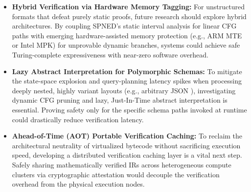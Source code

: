 \documentclass[onecolumn]{IEEEtran}
\numberwithin{equation}{section}
\theoremstyle{definition}
\theoremstyle{remark}
\begin{document}
\begin{itemize}
    \item \textbf{Hybrid Verification via Hardware Memory Tagging:} For unstructured formats that defeat purely static proofs, future research should explore hybrid architectures. By coupling SPNED's static interval analysis for linear CFG paths with emerging hardware-assisted memory protection (e.g., ARM MTE or Intel MPK) \cite{vishwanathan2023verifying} for unprovable dynamic branches, systems could achieve safe Turing-complete expressiveness with near-zero software overhead.
    \item \textbf{Lazy Abstract Interpretation for Polymorphic Schemas:} To mitigate the state-space explosion and query-planning latency spikes when processing deeply nested, highly variant layouts (e.g., arbitrary JSON \cite{ecma1997json}), investigating dynamic CFG pruning and lazy, Just-In-Time abstract interpretation \cite{anneser2023autosteer} is essential. Proving safety only for the specific schema paths invoked at runtime could drastically reduce verification latency.
    \item \textbf{Ahead-of-Time (AOT) Portable Verification Caching:} To reclaim the architectural neutrality of virtualized bytecode without sacrificing execution speed, developing a distributed verification caching layer is a vital next step. Safely sharing mathematically verified IRs across heterogeneous compute clusters via cryptographic attestation would decouple the verification overhead from the physical execution nodes.
\end{itemize}



\end{document}
